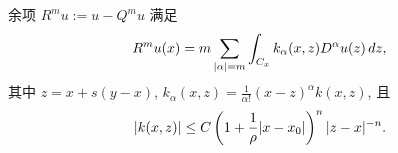 \setcounter{thmcount}{7}
\begin{Proposition}
\label{prop:ch04-remainder-kernel-representation}
余项 $R^m u:=u-Q^m u$ 满足
\begin{equation}
\MathBookFormulaID{formula-ch04-remainder-kernel-representation}
\label{eq:ch04-remainder-kernel-representation}
R^m u(x)=m\sum_{|\alpha|=m}\int_{C_x}k_\alpha(x,z)D^\alpha u(z)\,dz,
\end{equation}
其中 $z=x+s(y-x)$, $k_\alpha(x,z)=\frac1{\alpha!}(x-z)^\alpha k(x,z)$, 且
\begin{equation}
\MathBookFormulaID{formula-ch04-remainder-kernel-bound}
\label{eq:ch04-remainder-kernel-bound}
|k(x,z)|\leq C\left(1+\frac1\rho|x-x_0|\right)^n|z-x|^{-n}.
\end{equation}
\end{Proposition}
